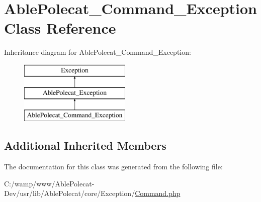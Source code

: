 \hypertarget{class_able_polecat___command___exception}{}\section{Able\+Polecat\+\_\+\+Command\+\_\+\+Exception Class Reference}
\label{class_able_polecat___command___exception}
Inheritance diagram for Able\+Polecat\+\_\+\+Command\+\_\+\+Exception\+:\begin{figure}[H]
\begin{center}
\leavevmode
\includegraphics[height=3.000000cm]{class_able_polecat___command___exception}
\end{center}
\end{figure}
\subsection*{Additional Inherited Members}


The documentation for this class was generated from the following file\+:\begin{DoxyCompactItemize}
\item 
C\+:/wamp/www/\+Able\+Polecat-\/\+Dev/usr/lib/\+Able\+Polecat/core/\+Exception/\hyperlink{_exception_2_command_8php}{Command.\+php}\end{DoxyCompactItemize}
